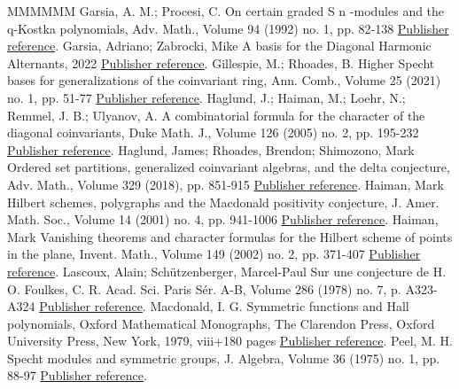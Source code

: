 \begin{thebibliography}{MMMMMM}
 Garsia, A. M.; Procesi, C. On certain graded S n -modules and the q-Kostka polynomials, Adv. Math., Volume 94 (1992) no. 1, pp. 82-138 \href{https://alco.centre-mersenne.org/articles/10.5802/alco.396/#GarsiaProcesi}{Publisher reference}.
 Garsia, Adriano; Zabrocki, Mike A basis for the Diagonal Harmonic Alternants, 2022 \href{https://alco.centre-mersenne.org/articles/10.5802/alco.396/#garsiaZabrocki}{Publisher reference}.
 Gillespie, M.; Rhoades, B. Higher Specht bases for generalizations of the coinvariant ring, Ann. Comb., Volume 25 (2021) no. 1, pp. 51-77 \href{https://alco.centre-mersenne.org/articles/10.5802/alco.396/#GillespieRhoades}{Publisher reference}.
 Haglund, J.; Haiman, M.; Loehr, N.; Remmel, J. B.; Ulyanov, A. A combinatorial formula for the character of the diagonal coinvariants, Duke Math. J., Volume 126 (2005) no. 2, pp. 195-232 \href{https://alco.centre-mersenne.org/articles/10.5802/alco.396/#HHLRU}{Publisher reference}.
 Haglund, James; Rhoades, Brendon; Shimozono, Mark Ordered set partitions, generalized coinvariant algebras, and the delta conjecture, Adv. Math., Volume 329 (2018), pp. 851-915 \href{https://alco.centre-mersenne.org/articles/10.5802/alco.396/#HRS}{Publisher reference}.
 Haiman, Mark Hilbert schemes, polygraphs and the Macdonald positivity conjecture, J. Amer. Math. Soc., Volume 14 (2001) no. 4, pp. 941-1006 \href{https://alco.centre-mersenne.org/articles/10.5802/alco.396/#HaimanGeometry}{Publisher reference}.
 Haiman, Mark Vanishing theorems and character formulas for the Hilbert scheme of points in the plane, Invent. Math., Volume 149 (2002) no. 2, pp. 371-407 \href{https://alco.centre-mersenne.org/articles/10.5802/alco.396/#HaimanDR}{Publisher reference}.
 Lascoux, Alain; Schützenberger, Marcel-Paul Sur une conjecture de H. O. Foulkes, C. R. Acad. Sci. Paris Sér. A-B, Volume 286 (1978) no. 7, p. A323-A324 \href{https://alco.centre-mersenne.org/articles/10.5802/alco.396/#LascouxSchutzenberger}{Publisher reference}.
 Macdonald, I. G. Symmetric functions and Hall polynomials, Oxford Mathematical Monographs, The Clarendon Press, Oxford University Press, New York, 1979, viii+180 pages \href{https://alco.centre-mersenne.org/articles/10.5802/alco.396/#Macdonald}{Publisher reference}.
 Peel, M. H. Specht modules and symmetric groups, J. Algebra, Volume 36 (1975) no. 1, pp. 88-97 \href{https://alco.centre-mersenne.org/articles/10.5802/alco.396/#Peel}{Publisher reference}.

\end{thebibliography}
